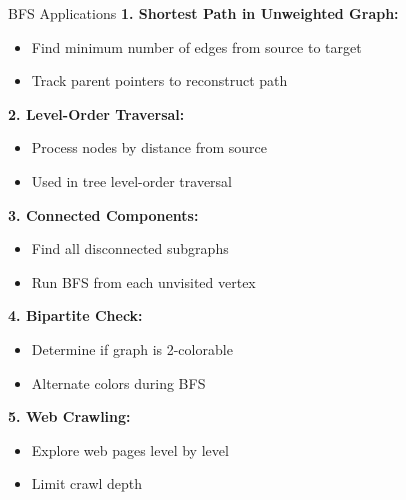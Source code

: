 \documentclass[aspectratio=169]{beamer}
\begin{document}
\begin{frame}{BFS Applications}
  \textbf{1. Shortest Path in Unweighted Graph:}
  \begin{itemize}
    \item Find minimum number of edges from source to target
    \item Track parent pointers to reconstruct path
  \end{itemize}

  \vspace{0.2cm}
  \textbf{2. Level-Order Traversal:}
  \begin{itemize}
    \item Process nodes by distance from source
    \item Used in tree level-order traversal
  \end{itemize}

  \vspace{0.2cm}
  \textbf{3. Connected Components:}
  \begin{itemize}
    \item Find all disconnected subgraphs
    \item Run BFS from each unvisited vertex
  \end{itemize}

  \vspace{0.2cm}
  \textbf{4. Bipartite Check:}
  \begin{itemize}
    \item Determine if graph is 2-colorable
    \item Alternate colors during BFS
  \end{itemize}

  \vspace{0.2cm}
  \textbf{5. Web Crawling:}
  \begin{itemize}
    \item Explore web pages level by level
    \item Limit crawl depth
  \end{itemize}
\end{frame}
\end{document}
